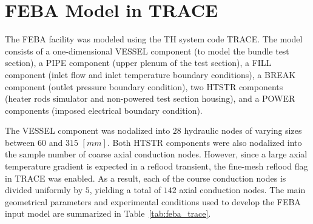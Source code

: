 \section{FEBA Model in TRACE}\label{sec:reflood_feba_trace}

The \textsc{FEBA} facility was modeled using the TH system code \textsc{TRACE}.
The model consists of a one-dimensional \textsc{VESSEL} component (to model the bundle test section),
a \textsc{PIPE} component (upper plenum of the test section), 
a \textsc{FILL} component (inlet flow and inlet temperature boundary conditions),
a \textsc{BREAK} component (outlet pressure boundary condition),
two \textsc{HTSTR} components (heater rods simulator and non-powered test section housing),
and a \textsc{POWER} components (imposed electrical boundary condition).

The \textsc{VESSEL} component was nodalized into $28$ hydraulic nodes of varying sizes between $60$ and $315$ $[mm]$.
Both \textsc{HTSTR} components were also nodalized into the sample number of coarse axial conduction nodes.
However, since a large axial temperature gradient is expected in a reflood transient,
the fine-mesh reflood flag in \textsc{TRACE} was enabled.
As a result, each of the course conduction nodes is divided uniformly by $5$,
yielding a total of $142$ axial conduction nodes.
The main geometrical parameters and experimental conditions used to develop the \textsc{FEBA} input model
are summarized in Table~\ref{tab:feba_trace}.

